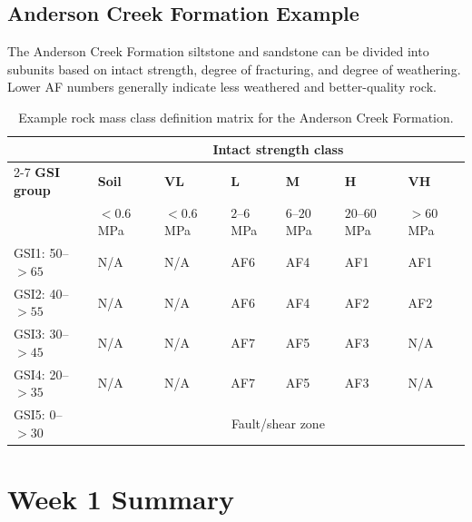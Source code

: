 \documentclass[a4paper,12pt]{article}
\begin{document}
\subsection{Anderson Creek Formation Example}
The Anderson Creek Formation siltstone and sandstone can be divided into subunits based on intact strength, degree of fracturing, and degree of weathering. Lower AF numbers generally indicate less weathered and better-quality rock.

\begin{table}[H]
\centering
\footnotesize
\begin{tabularx}{\textwidth}{l X X X X X X}
\toprule
 & \multicolumn{6}{c}{\textbf{Intact strength class}} \\
\cmidrule(lr){2-7}
\textbf{GSI group} & \textbf{Soil} & \textbf{VL} & \textbf{L} & \textbf{M} & \textbf{H} & \textbf{VH} \\
 & $<0.6$ MPa & $<0.6$ MPa & $2$--$6$ MPa & $6$--$20$ MPa & $20$--$60$ MPa & $>60$ MPa \\
\midrule
GSI1: 50--$>65$ & N/A & N/A & AF6 & AF4 & AF1 & AF1 \\
GSI2: 40--$>55$ & N/A & N/A & AF6 & AF4 & AF2 & AF2 \\
GSI3: 30--$>45$ & N/A & N/A & AF7 & AF5 & AF3 & N/A \\
GSI4: 20--$>35$ & N/A & N/A & AF7 & AF5 & AF3 & N/A \\
GSI5: 0--$>30$ & \multicolumn{6}{c}{Fault/shear zone} \\
\bottomrule
\end{tabularx}
\caption{Example rock mass class definition matrix for the Anderson Creek Formation.}
\end{table}

\section{Week 1 Summary}
\end{document}
